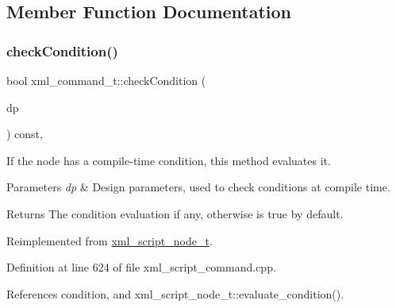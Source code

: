 \subsection{Member Function Documentation}
\mbox{\label{classxml__command__t_a0bd9c4cf582f671898afd9ec1602a1dd}} 
\subsubsection{\texorpdfstring{check\+Condition()}{checkCondition()}}
{\footnotesize\ttfamily bool xml\+\_\+command\+\_\+t\+::check\+Condition (\begin{DoxyParamCaption}\item[{const \hyperlink{DesignParameters_8hpp_ae36bb1c4c9150d0eeecfe1f96f42d157}{Design\+Parameters\+Ref} \&}]{dp }\end{DoxyParamCaption}) const\hspace{0.3cm}{\ttfamily [override]}, {\ttfamily [virtual]}}



If the node has a compile-\/time condition, this method evaluates it. 


\begin{DoxyParams}{Parameters}
{\em dp} & Design parameters, used to check conditions at compile time. \\
\hline
\end{DoxyParams}
\begin{DoxyReturn}{Returns}
The condition evaluation if any, otherwise is true by default. 
\end{DoxyReturn}


Reimplemented from \hyperlink{classxml__script__node__t_a13fbe7caa7bed64ab3cc25d51392523d}{xml\+\_\+script\+\_\+node\+\_\+t}.



Definition at line 624 of file xml\+\_\+script\+\_\+command.\+cpp.



References condition, and xml\+\_\+script\+\_\+node\+\_\+t\+::evaluate\+\_\+condition().

